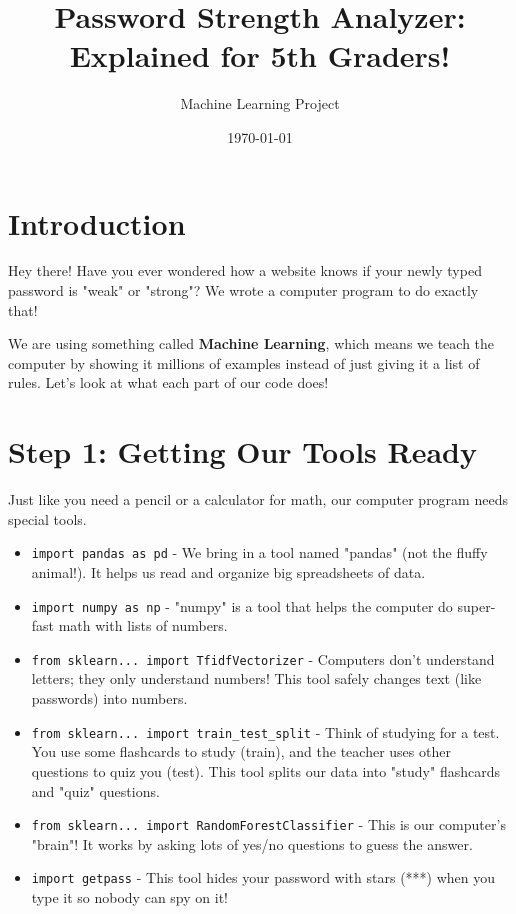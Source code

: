 \documentclass{article}
\title{Password Strength Analyzer: \\ \large Explained for 5th Graders!}
\author{Machine Learning Project}
\date{\today}
\begin{document}
\maketitle

\section*{Introduction}
Hey there! Have you ever wondered how a website knows if your newly typed password is "weak" or "strong"? We wrote a computer program to do exactly that! 

We are using something called \textbf{Machine Learning}, which means we teach the computer by showing it millions of examples instead of just giving it a list of rules. Let's look at what each part of our code does!

\section*{Step 1: Getting Our Tools Ready}
Just like you need a pencil or a calculator for math, our computer program needs special tools.

\begin{itemize}
    \item \texttt{import pandas as pd} - We bring in a tool named "pandas" (not the fluffy animal!). It helps us read and organize big spreadsheets of data.
    \item \texttt{import numpy as np} - "numpy" is a tool that helps the computer do super-fast math with lists of numbers.
    \item \texttt{from sklearn... import TfidfVectorizer} - Computers don't understand letters; they only understand numbers! This tool safely changes text (like passwords) into numbers.
    \item \texttt{from sklearn... import train\_test\_split} - Think of studying for a test. You use some flashcards to study (train), and the teacher uses other questions to quiz you (test). This tool splits our data into "study" flashcards and "quiz" questions.
    \item \texttt{from sklearn... import RandomForestClassifier} - This is our computer's "brain"! It works by asking lots of yes/no questions to guess the answer.
    \item \texttt{import getpass} - This tool hides your password with stars (***) when you type it so nobody can spy on it!
\end{itemize}
\end{document}
